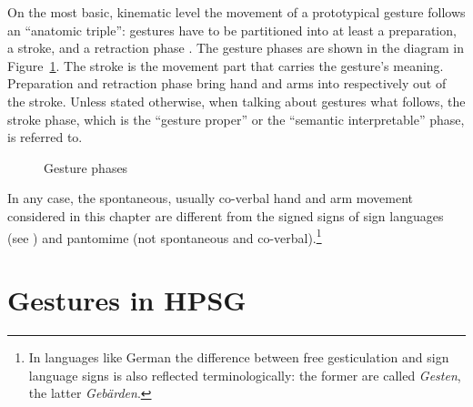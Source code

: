 \documentclass[output=paper]{langsci/langscibook}
\begin{document}
On the most basic, kinematic level the movement of a prototypical gesture follows an \enquote{anatomic triple}: gestures have to be partitioned into at least a preparation, a stroke, and a retraction     phase \citep{Kendon:1972}.
%
The gesture phases are shown in the diagram in Figure~\ref{fig:gesture-phases}.
%
The stroke is the movement part that carries the gesture's meaning. 
%
Preparation and retraction phase bring hand and arms into respectively out of the stroke. 
%
Unless stated otherwise, when talking about gestures what follows, the stroke phase, which is the \enquote{gesture proper} or the \enquote{semantic interpretable} phase, is referred to.

\begin{figure}[tb]
  \centering
  \caption{Gesture phases}
  \label{fig:gesture-phases}
\end{figure}


In any case, the spontaneous, usually co-verbal hand and arm movement considered in this chapter are different from the signed signs of sign languages  (see ) and pantomime  (not spontaneous and co-verbal).\footnote{In languages like German the difference between free gesticulation and sign language signs is also reflected terminologically: the former are called \textit{Gesten}, the latter \textit{Gebärden}.}




\section{Gestures in HPSG}
\label{sec:gestures-hpsg}
\end{document}
